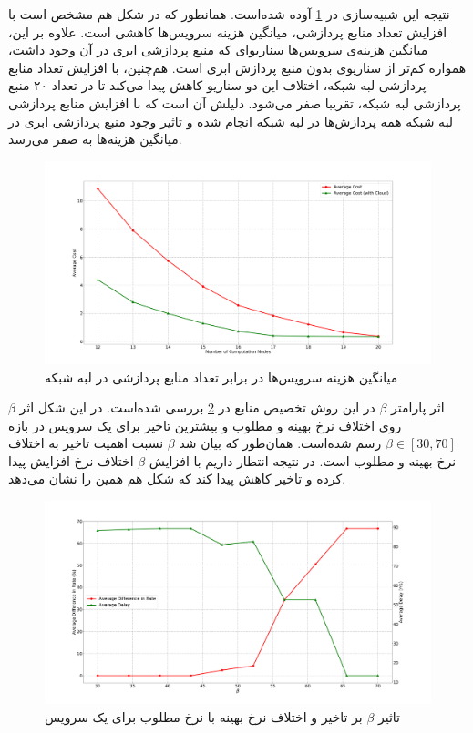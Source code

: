     نتیجه این شبیه‌سازی در \cref{fig:many_to_many:sim6} آوده شده‌است.
    همانطور که در شکل هم مشخص است با افزایش تعداد منابع پردازشی، میانگین هزینه سرویس‌ها کاهشی است.
    علاوه بر این، میانگین هزینه‌ی سرویس‌ها سناریوای که منبع پردازشی ابری در آن وجود داشت، همواره کم‌تر از سناریوی بدون منبع پردازش ابری است.
    هم‌چنین، با افزایش تعداد منابع پردازشی لبه شبکه، اختلاف این دو سناریو کاهش پیدا می‌کند تا در تعداد ۲۰ منبع پردازشی لبه شبکه، تقریبا صفر می‌شود.
    دلیلش آن است که با افزایش منابع پردازشی لبه شبکه همه پردازش‌ها در لبه شبکه انجام شده و تاثیر وجود منبع پردازشی ابری در میانگین هزینه‌ها به صفر می‌رسد.

    \begin{figure}[H]
      \centerline{\includegraphics[width=17cm]{graphics/many_to_many/sim_6}}
      \caption{میانگین هزینه سرویس‌ها در برابر تعداد منابع پردازشی در لبه شبکه}
      \label{fig:many_to_many:sim6}
    \end{figure}

    اثر پارامتر $\beta$ در این روش تخصیص منابع در \cref{fig:many_to_many:sim7} بررسی شده‌است.
    در این شکل اثر $\beta$ روی اختلاف نرخ بهینه و مطلوب و بیشترین تاخیر برای یک سرویس در بازه $\beta\in[30, 70]$ رسم شده‌است.
    همان‌طور که بیان شد $\beta$ نسبت اهمیت تاخیر به اختلاف نرخ بهینه و مطلوب است.
    در نتیجه انتظار داریم با افزایش $\beta$ اختلاف نرخ افزایش پیدا کرده و تاخیر کاهش پیدا کند که شکل هم همین را نشان می‌دهد.
    
    \begin{figure}[]
      \centerline{\includegraphics[width=17cm]{graphics/many_to_many/sim_7}}
      \caption{تاثیر $\beta$ بر تاخیر و اختلاف نرخ بهینه با نرخ مطلوب برای یک سرویس}
      \label{fig:many_to_many:sim7}
    \end{figure}

